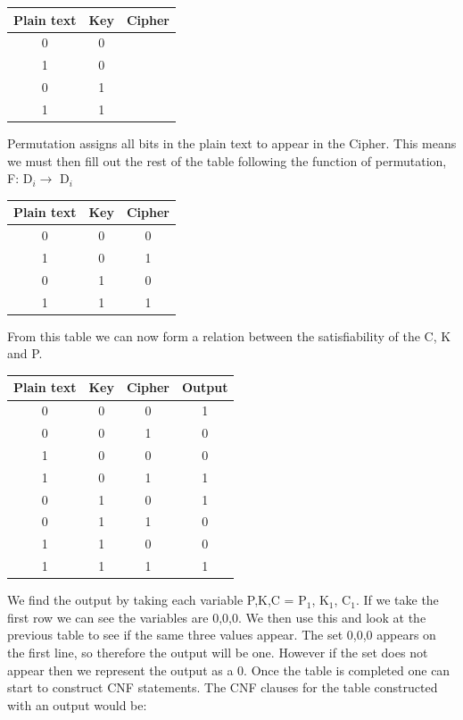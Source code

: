 \documentclass[11pt,a4paper]{report}
\begin{document}
\begin{center}
\begin{tabular}{|c|c|c|}
\hline
Plain text & Key & Cipher\\ \hline
0 & 0 & {}\\ \hline
1 & 0 & {}\\ \hline
0 & 1 & {}\\ \hline
1 & 1 & {}\\ \hline
\end{tabular}
\end{center}
Permutation assigns all bits in the plain text to appear in the Cipher. This means we must then fill out the rest of the table following the function of permutation, F: D$_{i} \rightarrow$ D$_{i}$

\begin{center}
\begin{tabular}{|c|c|c|}
\hline
Plain text & Key & Cipher\\ \hline
0 & 0 & 0\\ \hline
1 & 0 & 1\\ \hline
0 & 1 & 0\\ \hline
1 & 1 & 1\\ \hline
\end{tabular}
\end{center}
From this table we can now form a relation between the satisfiability of the C, K and P.


\begin{center}
\begin{tabular}{|c|c|c|c|}
\hline
Plain text & Key & Cipher & Output\\ \hline
0 & 0 & 0 & 1\\ \hline
0 & 0 & 1 & 0\\ \hline
1 & 0 & 0 & 0\\ \hline
1 & 0 & 1 & 1\\ \hline
0 & 1 & 0 & 1\\ \hline
0 & 1 & 1 & 0\\ \hline
1 & 1 & 0 & 0\\ \hline
1 & 1 & 1 & 1\\ \hline
\end{tabular}
\end{center}
We find the output by taking each variable {P,K,C} = {P$_{1}$, K$_{1}$, C$_{1}$}. If we take the first row we can see the variables are {0,0,0}. We then use this and look at the previous table to see if the same three values appear. The set {0,0,0} appears on the first line, so therefore the output will be one. However if the set does not appear then we represent the output as a 0. Once the table is completed one can start to construct CNF statements. 
The CNF clauses for the table constructed with an output would be:
\end{document}
